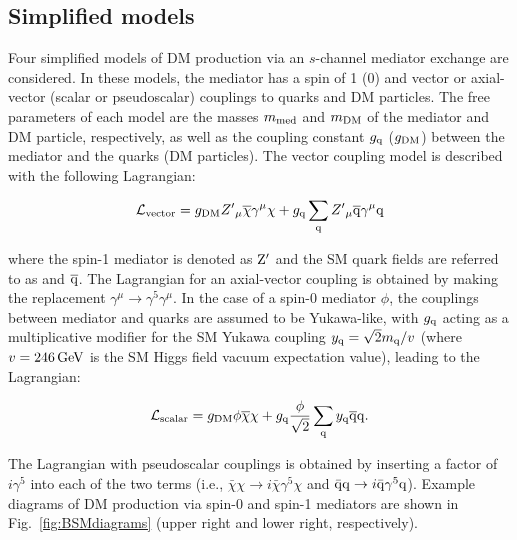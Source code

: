 \subsection{Simplified models}
Four simplified models of DM production via an $s$-channel mediator exchange are considered.
In these models, the mediator has a spin of 1 (0) and vector or axial-vector (scalar or pseudoscalar) couplings to quarks and DM particles.
The free parameters of each model are the masses $m_{\rm med}$ and $m_{\rm DM}$ of the mediator and DM particle, respectively, as well as the coupling
constant $g_{\mathrm{q}}$ ($g_{\rm DM}$) between the mediator and the quarks (DM particles).
The vector coupling model is described with the following Lagrangian:

\begin{equation*}
\mathcal{L}_{\text{vector}} = g_{\rm DM} {Z'}_{\mu}\overline{\chi}\gamma^{\mu}\chi  + g_{\mathrm{q}} \sum_{\mathrm{q}} {Z'}_{\mu} \overline{\mathrm{q}}\gamma^{\mu}\mathrm{q}
\end{equation*}

\noindent where the spin-1 mediator is denoted as $\mathrm{Z}'$ and the SM quark fields are referred to as \PQq and $\overline{\mathrm{q}}$.
The Lagrangian for an axial-vector coupling is obtained by making the replacement $\gamma^\mu\rightarrow\gamma^5\gamma^\mu$.
In the case of a spin-0 mediator $\phi$, the couplings between mediator and quarks are assumed to be Yukawa-like, with $g_{\mathrm{q}}$ acting as a 
multiplicative modifier for the SM Yukawa coupling ${y_{\mathrm{q}} = \sqrt{2}m_{\mathrm{q}}/v}$ (where $v = 246 \,\text{Ge\hspace{-.08em}V}$ is the SM Higgs field vacuum expectation value),
leading to the Lagrangian:

\begin{equation*}
\mathcal{L}_{\text{scalar}} = g_{\rm DM} {\phi}\overline{\chi}\chi  + g_{\mathrm{q}} \frac{\phi}{\sqrt{2}}\sum_{\mathrm{q}} y_{\mathrm{q}} \overline{\mathrm{q}}\mathrm{q}.
\end{equation*}

\noindent The Lagrangian with pseudoscalar couplings is obtained by inserting a factor of $i\gamma^5$ into each of the two terms (i.e., $\bar\chi\chi \to i\bar\chi\gamma^5\chi$ and $\bar {\mathrm{q}} \mathrm{q} \to i\bar {\mathrm{q}}\gamma^5 \mathrm{q}$). Example diagrams of DM production via spin-0 and spin-1 mediators are shown in Fig.~\ref{fig:BSMdiagrams} (upper right and lower right, respectively).


